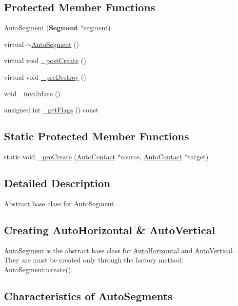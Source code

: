 \subsection*{Protected Member Functions}
\begin{DoxyCompactItemize}
\item 
\hyperlink{classKatabatic_1_1AutoSegment_ae64a61508d148cb4a0ee9b5ffb177659}{Auto\-Segment} ({\bf Segment} $\ast$segment)
\item 
virtual \hyperlink{classKatabatic_1_1AutoSegment_a5d135025de0c1725d6252099c2e70e2b}{$\sim$\-Auto\-Segment} ()
\item 
virtual void \hyperlink{classKatabatic_1_1AutoSegment_a3715b38135ca24745f610bebd3407c10}{\-\_\-post\-Create} ()
\item 
virtual void \hyperlink{classKatabatic_1_1AutoSegment_a7c13d9795eafd477994961f8a0d962d0}{\-\_\-pre\-Destroy} ()
\item 
void \hyperlink{classKatabatic_1_1AutoSegment_a6a98d2e5839b880893703ad45db4e4c4}{\-\_\-invalidate} ()
\item 
unsigned int \hyperlink{classKatabatic_1_1AutoSegment_ade0d97282e43595452ae8ac326d99752}{\-\_\-get\-Flags} () const 
\end{DoxyCompactItemize}
\subsection*{Static Protected Member Functions}
\begin{DoxyCompactItemize}
\item 
static void \hyperlink{classKatabatic_1_1AutoSegment_a8348937b1db79480305b178482d3ed61}{\-\_\-pre\-Create} (\hyperlink{classKatabatic_1_1AutoContact}{Auto\-Contact} $\ast$source, \hyperlink{classKatabatic_1_1AutoContact}{Auto\-Contact} $\ast$target)
\end{DoxyCompactItemize}


\subsection{Detailed Description}
Abstract base class for \hyperlink{classKatabatic_1_1AutoSegment}{Auto\-Segment}. 

\hypertarget{classKatabatic_1_1AutoSegment_secASCreation}{}\subsection{Creating Auto\-Horizontal \& Auto\-Vertical}\label{classKatabatic_1_1AutoSegment_secASCreation}
\hyperlink{classKatabatic_1_1AutoSegment}{Auto\-Segment} is the abstract base class for \hyperlink{classKatabatic_1_1AutoHorizontal}{Auto\-Horizontal} and \hyperlink{classKatabatic_1_1AutoVertical}{Auto\-Vertical}. They are must be created only through the factory method\-: \hyperlink{classKatabatic_1_1AutoSegment_ab0cc9e57beeceec519cd4bd3e415569e}{Auto\-Segment\-::create()}.\hypertarget{classKatabatic_1_1AutoSegment_secASCharacteristics}{}\subsection{Characteristics of Auto\-Segments}\label{classKatabatic_1_1AutoSegment_secASCharacteristics}

